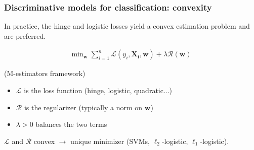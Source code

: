 \begin{frame}
\frametitle{Discriminative models for classification: convexity} 

In practice, the hinge and logistic losses yield a convex estimation
problem and are preferred.

\begin{align*}
\text{min}_{\mathbf{w}} \; \sum_{i=1}^n \mathcal{L}(y_i,\mathbf{X_i},\mathbf{w}) + \lambda \mathcal{R} (\mathbf{w})
\end{align*}


(M-estimators framework)
\begin{itemize}
\item $\mathcal{L}$ is the loss function (hinge, logistic, quadratic...)
\item $\mathcal{R}$ is the regularizer (typically a norm on $\mathbf{w}$) 
\item $\lambda > 0$ balances the two terms
\end{itemize}
$\mathcal{L}$ and $\mathcal{R}$ convex $\rightarrow$ unique minimizer (SVMs, $\ell_2$-logistic, $\ell_1$-logistic).
\end{frame}



